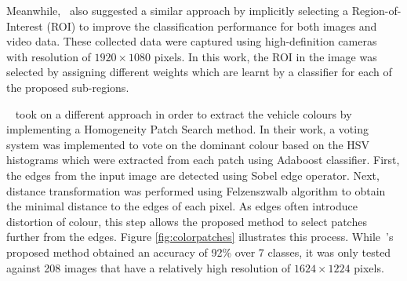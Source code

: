 Meanwhile,~ also
suggested a similar approach by implicitly selecting a Region-of-Interest (ROI) to improve the classification performance for both images and video data. These collected data were captured using high-definition cameras with resolution of $1920 \times 1080$ pixels. In this work, the ROI in the image was selected by assigning different weights which are learnt by a classifier for each of the proposed sub-regions.

~ took on a different approach in order to extract
the vehicle colours by implementing a Homogeneity Patch Search method. In their work, a voting system was implemented to vote on the dominant colour based on the HSV histograms which were extracted from each patch using Adaboost classifier. First, the edges from the input image are detected using Sobel edge operator. Next, distance transformation was performed using Felzenszwalb algorithm to obtain the minimal distance to the edges of each pixel. As edges often introduce distortion of colour, this step allows the proposed method to select patches further from the edges. Figure \ref{fig:colorpatches} illustrates this
process. While~'s proposed method obtained an
accuracy of 92\% over 7 classes, it was only tested against 208 images that have
a relatively high resolution of $1624 \times 1224$ pixels.

